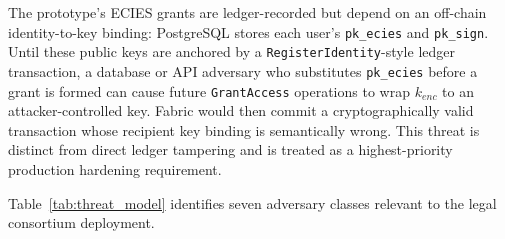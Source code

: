 \documentclass{ieeeaccess}
\begin{document}
The prototype's ECIES grants are ledger-recorded but depend on an
off-chain identity-to-key binding: PostgreSQL stores each user's
\texttt{pk\_ecies} and \texttt{pk\_sign}. Until these public keys are
anchored by a \texttt{RegisterIdentity}-style ledger transaction, a
database or API adversary who substitutes \texttt{pk\_ecies} before a
grant is formed can cause future \texttt{GrantAccess} operations to
wrap $k_{enc}$ to an attacker-controlled key. Fabric would then commit
a cryptographically valid transaction whose recipient key binding is
semantically wrong. This threat is distinct from direct ledger
tampering and is treated as a highest-priority production hardening
requirement.

Table~\ref{tab:threat_model} identifies seven adversary classes
relevant to the legal consortium deployment.
\end{document}
